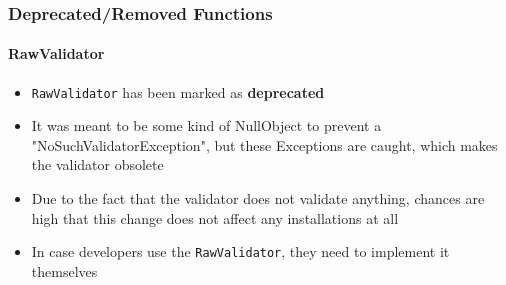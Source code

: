 \begin{frame}[fragile]
	\frametitle{Deprecated/Removed Functions}
	\framesubtitle{RawValidator}

	\begin{itemize}
		\item \texttt{RawValidator} has been marked as \textbf{deprecated}
		\item It was meant to be some kind of NullObject to prevent a "NoSuchValidatorException",
			but these Exceptions are caught, which makes the validator obsolete
		\item Due to the fact that the validator does not validate anything,
			chances are high that this change does not affect any installations at all
		\item In case developers use the \texttt{RawValidator}, they need to implement it themselves
	\end{itemize}


\end{frame}

